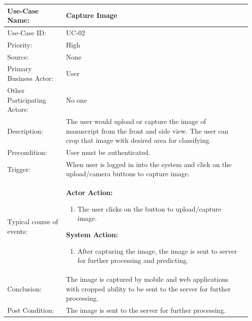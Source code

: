 \begin{table}[H]
    \centering
    \begin{tabular}{|l|p{}|p{}|}
    	\hline
    	Use-Case Name: & Capture Image\\ \hline
    	Use-Case ID:& UC-02 \\\hline
    	Priority:& High\\ \hline
    	Source:& None \\ \hline
    	Primary Business Actor: & User \\ \hline
    	Other Participating Actors:&  No one\\ \hline
    	Description:&  The user would upload or capture the image of manuscript from the front and side view. The user can crop that image with desired area for classifying.  \\ \hline
    	Precondition:&  User must be authenticated. \\ \hline
    	Trigger:&  When user is logged in into the system and click on the upload/camera buttons to capture image. \\ \hline 
    	Typical course of events:&  \textbf{Actor Action:}
    	\begin{enumerate}
    		\item 	The user clicks on the button to upload/capture image.
    	\end{enumerate}
    
    	\vspace{2mm}
    	
    	\textbf{System Action: }
    	\begin{enumerate}
    		\item After capturing the image, the image is sent to server for further processing and predicting.
    	\end{enumerate}
    	\\ \hline
    	Conclusion:  & The image is captured by mobile and web applications with cropped ability to be sent to the server for further processing.\\ \hline
    	Post Condition: & The image is sent to the server for further processing. \\ \hline
    \end{tabular}\\
\end{table}

\pagebreak

